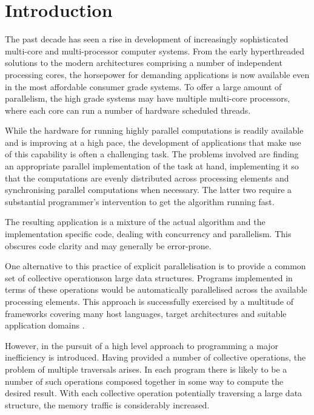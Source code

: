 \documentclass[preamble.tex]{subfiles}
\begin{document}
\clearpage

\chapter{Introduction}
\label{ch:introduction}

The past decade has seen a rise in development of increasingly sophisticated multi-core and multi-processor computer systems. From the early hyperthreaded solutions to the modern architectures comprising a number of independent processing cores, the horsepower for demanding applications is now available even in the most affordable consumer grade systems. To offer a large amount of parallelism, the high grade systems may have multiple multi-core processors, where each core can run a number of hardware scheduled threads.

While the hardware for running highly parallel computations is readily available and is improving at a high pace, the development of applications that make use of this capability is often a challenging task. The problems involved are finding an appropriate parallel implementation of the task at hand, implementing it so that the computations are evenly distributed across processing elements and synchronising parallel computations when necessary. The latter two require a substantial programmer's intervention to get the algorithm running fast.


The resulting application is a mixture of the actual algorithm and the implementation specific code, dealing with concurrency and parallelism. This obscures code clarity and may generally be error-prone.

One alternative to this practice of explicit parallelisation is to provide a common set of collective operations\icollop on large data structures. Programs implemented in terms of these operations would be automatically parallelised across the available processing elements. This approach is successfully exercised by a multitude of frameworks covering many host languages, target architectures and suitable application domains \cite{PLKC08,KCL+10,CKL+11,AS07}.

However, in the pursuit of a high level approach to programming a major inefficiency is introduced. Having provided a number of collective operations, the problem of multiple traversals arises. In each program there is likely to be a number of such operations composed together in some way to compute the desired result. With each collective operation potentially traversing a large data structure, the memory traffic is considerably increased.
\end{document}
